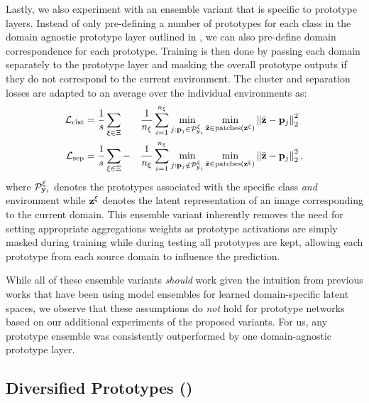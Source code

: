 Lastly, we also experiment with an ensemble variant that is specific to prototype layers. Instead of only pre-defining a number of prototypes for each class in the domain agnostic prototype layer outlined in , we can also pre-define domain correspondence for each prototype. Training is then done by passing each domain separately to the prototype layer and masking the overall prototype outputs if they do not correspond to the current environment. The cluster and separation losses are adapted to an average over the individual environments as:
\begin{alignat}{3}
\label{eq:prototype_losses_domain}
    \mathcal{L}_{\mathrm{clst}} &= \frac{1}{s} \sum_{\xi \in \Xi} &&\frac{1}{n_\xi} \sum_{i=1}^{n_\xi} \min_{j: \mathbf{p}_{j}\in \mathcal{P}_{\mathbf{y}_i}^\xi} \min_{\Bar{\mathbf{z}} \in \text{patches}(\mathbf{z}^\xi)} \left\|\Bar{\mathbf{z}} - \mathbf{p}_{j}\right\|^2_2\\
    \mathcal{L}_{\mathrm{sep}} &= \frac{1}{s} \sum_{\xi \in \Xi}-&&\frac{1}{n_\xi} \sum_{i=1}^{n_\xi} \min_{j: \mathbf{p}_{j} \notin \mathcal{P}_{\mathbf{y}_i}^\xi} \min_{\Bar{\mathbf{z}} \in \text{patches}(\mathbf{z}^\xi)} \left\|\Bar{\mathbf{z}} - \mathbf{p}_{j}\right\|^2_2,
\end{alignat}
where $\mathcal{P}_{\mathbf{y}_i}^\xi$ denotes the prototypes associated with the specific class \emph{and} environment while $\mathbf{z}^\xi$ denotes the latent representation of an image corresponding to the current domain. This ensemble variant inherently removes the need for setting appropriate aggregations weights as prototype activations are simply masked during training while during testing all prototypes are kept, allowing each prototype from each source domain to influence the prediction.  

While all of these ensemble variants \emph{should} work given the intuition from previous works that have been using model ensembles for learned domain-specific latent spaces, we observe that these assumptions do \emph{not} hold for prototype networks based on our additional experiments of the proposed variants. For us, any prototype ensemble was consistently outperformed by one domain-agnostic prototype layer. 

\subsection{Diversified Prototypes (\prodrop)}
\label{sec:divpro}

